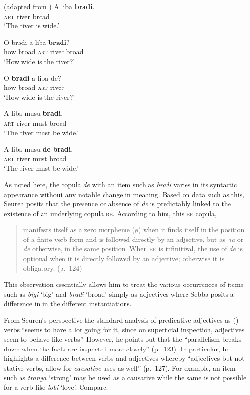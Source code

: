\ea\label{ex:3:10}  (adapted from \citealt[124]{Seuren1986}) 
\ea
\gll  A liba \textbf{bradi}.\\
\textsc{art} river broad\\
\glt    `The river is wide.'

\ex
\gll  O bradi a liba \textbf{bradi}?  \\
    how broad \textsc{art} river broad\\
\glt `How wide is the river?'

\ex
\gll  O \textbf{bradi} a liba de?    \\
     how broad \textsc{art} river {\COP}\\
\glt `How wide is the river?'

\ex
\gll A liba musu \textbf{bradi}.\\
\textsc{art} river must broad\\
\glt `The river must be wide.'

\ex
\gll  A liba musu \textbf{de} \textbf{bradi}.\\
\textsc{art} river must {\COP} broad\\
\glt `The river must be wide.'\z \z

As noted here, the copula \textit{de} with an item such as
\textit{bradi} varies in its syntactic appearance without any notable
change in meaning.  Based on data such as this, Seuren posits that the
presence or absence of \textit{de} is predictably linked to the
existence of an underlying copula \textsc{be}.  According to him, this \textsc{be}
copula,

\begin{quote}
manifests itself as a zero morpheme (ø) when it finds itself in the
position of a finite verb form and is followed directly by an
adjective, but as \textit{na} or \textit{de} otherwise, in the same
position. When \textsc{be} is infinitival, the use of \textit{de} is optional
when it is directly followed by an adjective; otherwise it is
obligatory.  (p.~124)
\end{quote}

This observation essentially allows him to treat the various
occurrences of items such as \textit{bigi} `big' and \textit{bradi}
`broad' simply as adjectives where Sebba posits a difference in
 in the different instantiations.

From Seuren’s perspective the standard analysis of predicative
adjectives as () verbs ``seems to have a lot going for it, since
on superficial inspection, adjectives seem to behave like verbs”.
However, he points out that the ``parallelism breaks down when the
facts are inspected more closely'' (p.~123).  In particular, he
highlights a difference between  verbs and adjectives whereby
``adjectives but not stative verbs, allow for \textit{causative} uses
as well” (p.~127).  For example, an item such as \textit{tranga}
 `strong’ may be used as a causative while the same is not possible for
a verb like \textit{lobi} `love'.  Compare:

